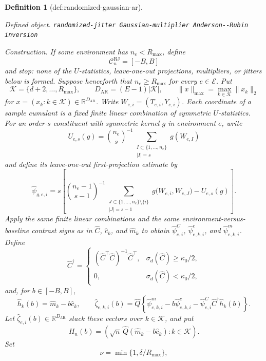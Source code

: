 \documentclass{article}
\newtheorem{definition}{Definition}
\begin{document}
\begin{definition}[def:randomized-gaussian-ar]\label{def:randomized-gaussian-ar}
\par\smallskip\noindent\emph{Defined object.} \texttt{randomized-\allowbreak{}jitter Gaussian-\allowbreak{}multiplier Anderson-\allowbreak{}-\allowbreak{}Rubin inversion}
\par\smallskip\noindent\emph{Construction.} If some environment has \(n_e<R_{\max}\), define
\[
 \mathcal C_n^{\mathrm{RJ}}=[-B,B]
\]
and stop: none of the \(U\)-statistics, leave-one-out projections, multipliers, or jitters below is formed.  Suppose henceforth that \(n_e\geq R_{\max}\) for every \(e\in\mathcal E\).  Put
\[
 \mathcal K=\{d+2,\ldots,R_{\max}\},
 \qquad
 D_{\mathrm{AR}}=(E-1)|\mathcal K|,
 \qquad
 \|x\|_{\max}=\max_{k\in\mathcal K}\|x_k\|_2
\]
for \(x=(x_k:k\in\mathcal K)\in\mathbb R^{D_{\mathrm{AR}}}\).  Write \(W_{e,i}=(T_{e,i},Y_{e,i})\).  Each coordinate of a sample cumulant is a fixed finite linear combination of symmetric \(U\)-statistics.  For an order-\(s\) constituent with symmetric kernel \(g\) in environment \(e\), write
\[
 U_{e,s}(g)={n_e\choose s}^{-1}
 \sum_{\substack{I\subset\{1,\ldots,n_e\}\\ |I|=s}}g(W_{e,I})
\]
and define its leave-one-out first-projection estimate by
\[
 \widehat\psi_{g,e,i}
 =s\left[
 {n_e-1\choose s-1}^{-1}
 \sum_{\substack{J\subset\{1,\ldots,n_e\}\setminus\{i\}\\ |J|=s-1}}
 g\bigl(W_{e,i},W_{e,J}\bigr)-U_{e,s}(g)
 \right].
\]
Apply the same finite linear combinations and the same environment-versus-baseline contrast signs as in \(\widehat C\), \(\widehat c_k\), and \(\widehat m_k\) to obtain \(\widehat\psi^C_{e,i}\), \(\widehat\psi^c_{e,k,i}\), and \(\widehat\psi^m_{e,k,i}\).  Define
\[
 \widehat C^\dagger=
 \begin{cases}
  (\widehat C^\top\widehat C)^{-1}\widehat C^\top,
    &\sigma_d(\widehat C)\geq\kappa_0/2,\\
  0,&\sigma_d(\widehat C)<\kappa_0/2,
 \end{cases}
\]
and, for \(b\in[-B,B]\),
\[
 \widehat h_k(b)=\widehat m_k-b\widehat c_k,
 \qquad
 \widehat\zeta_{e,k,i}(b)
 =\widehat Q\left\{
 \widehat\psi^m_{e,k,i}-b\widehat\psi^c_{e,k,i}
 -\widehat\psi^C_{e,i}\widehat C^\dagger\widehat h_k(b)
 \right\}.
\]
Let \(\widehat\zeta_{e,i}(b)\in\mathbb R^{D_{\mathrm{AR}}}\) stack these vectors over \(k\in\mathcal K\), and put
\[
 H_n(b)=\left(
 \sqrt n\,\widehat Q(\widehat m_k-b\widehat c_k):k\in\mathcal K
 \right).
\]
Set
\[
 \nu=\min\{1,\delta/R_{\max}\},
\]
\end{definition}
\end{document}
